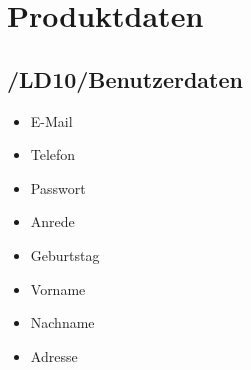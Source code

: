 
\section{Produktdaten}
\subsection*{/LD10/Benutzerdaten}
\begin{itemize}
	\item E-Mail
	\item Telefon
	\item Passwort
	\item Anrede
	\item Geburtstag
	\item Vorname
	\item Nachname
	\item Adresse
\end{itemize}